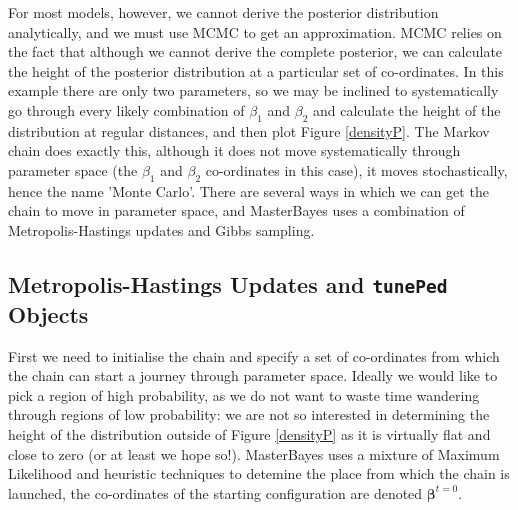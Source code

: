 \documentclass{article}
\begin{document}
For most models, however, we cannot derive the posterior distribution analytically, and we must use MCMC to get an approximation.  MCMC relies on the fact that although we cannot derive the complete posterior, we can calculate the height of the posterior distribution at a particular set of co-ordinates. In this example there are only two parameters, so we may be inclined to systematically go through every likely combination of $\beta_{1}$ and $\beta_{2}$ and calculate the height of the distribution at regular distances, and then plot Figure \ref{densityP}.  The Markov chain does exactly this, although it does not move systematically through parameter space (the $\beta_{1}$ and $\beta_{2}$ co-ordinates in this case), it moves stochastically, hence the name 'Monte Carlo'.  There are several ways in which we can get the chain to move in parameter space, and MasterBayes uses a combination of Metropolis-Hastings updates and Gibbs sampling.\\   

\subsection{Metropolis-Hastings Updates and \texttt{tunePed} Objects}

First we need to initialise the chain and specify a set of co-ordinates from which the chain can start a journey through parameter space. Ideally we would like to pick a region of high probability, as we do not want to waste time wandering through regions of low probability: we are not so interested in determining the height of the distribution outside of  Figure \ref{densityP} as it is virtually flat and close to zero (or at least we hope so!).  MasterBayes uses a mixture of Maximum Likelihood and heuristic techniques to detemine the place from which the chain is launched, the co-ordinates of the starting configuration are denoted $\bm{\beta}^{t=0}$.\\
\end{document}
